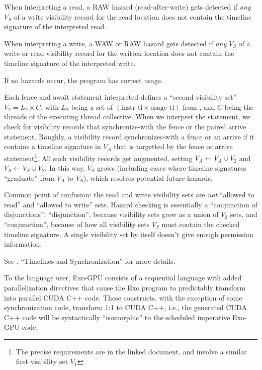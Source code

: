 \filbreak
When interpreting a read, a RAW hazard (read-after-write) gets detected if \textit{any} $V_S$ of a write visibility record for the read location does not contain the timeline signature of the interpreted read.

\filbreak
When interpreting a write, a WAW or RAW hazard gets detected if \textit{any} $V_S$ of a write or read visibility record for the written location does not contain the timeline signature of the interpreted write.

\filbreak
If no hazards occur, the program has correct usage.

\filbreak
Each fence and await statement interpreted defines a ``second visibility set'' $V_2 = L_2 \times C$, with $L_2$ being a set of $(\text{instr-tl} \times \text{usage-tl})$ from , and $C$ being the threads of the executing thread collective.
When we interpret the statement, we check for visibility records that synchronize-with the fence or the paired arrive statement.
Roughly, a visibility record synchronizes-with a fence or an arrive if it contains a timeline signature in $V_A$ that is targetted by the fence or arrive statement\footnote{The precise requirements are in the linked document, and involve a similar first visibility set $V_1$}.
All such visibility records get augmented, setting $V_A \leftarrow V_A \cup V_2$ and $V_S \leftarrow V_S \cup V_2$.
In this way, $V_S$ grows (including cases where timeline signatures ``graduate'' from $V_A$ to $V_S$), which resolves potential future hazards.

\filbreak
Common point of confusion: the read and write visibility sets are \textit{not} ``allowed to read'' and ``allowed to write'' sets.
Hazard checking is essentially a ``conjunction of disjunctions''; ``disjunction'', because visibility sets grow as a union of $V_2$ sets, and ``conjunction'', because of how all visibility sets $V_S$ must contain the checked timeline signature.
A single visibility set by itself doesn't give enough permission information.

\filbreak
See , ``Timelines and Synchronization'' for more details.

\filbreak
{}


To the language user, Exo-GPU consists of a sequential language with added parallelization directives that cause the Exo program to predictably transform into parallel CUDA C++ code.
These constructs, with the exception of some synchronization code, transform 1:1 to CUDA C++, i.e., the generated CUDA C++ code will be syntactically ``isomorphic'' to the scheduled imperative Exo-GPU code.


